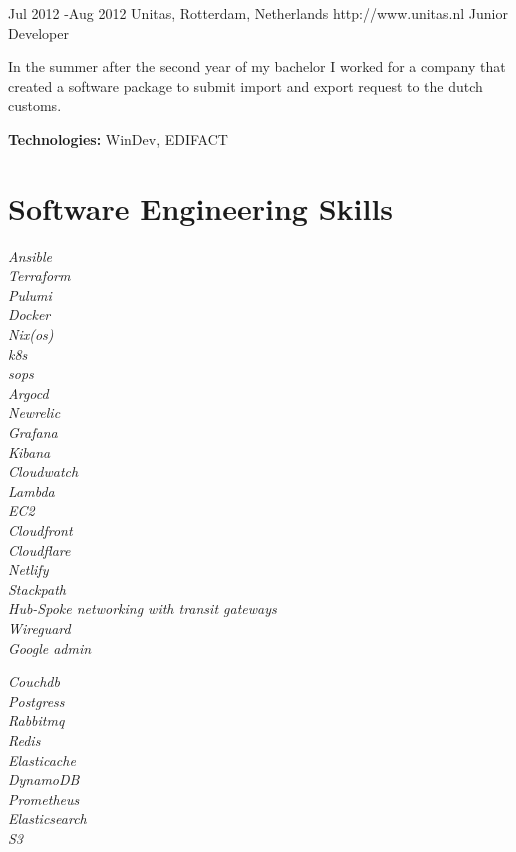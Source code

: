 \documentclass[10pt]{article} %
\begin{document}
\job
{Jul 2012 -}{Aug 2012}
{Unitas, Rotterdam, Netherlands}
{http://www.unitas.nl}
{Junior Developer}
{In the summer after the second year of my bachelor I worked for a company that created a software package to submit import and export request to the dutch customs.

\rule{0mm}{5mm}\textbf{Technologies:} WinDev, EDIFACT
}


\section{Software Engineering Skills}


{
\textit{Ansible}\\
\textit{Terraform}\\
\textit{Pulumi}\\
\textit{Docker}\\
\textit{Nix(os)}\\
\textit{k8s}\\
\textit{sops}\\
\textit{Argocd}\\
\textit{Newrelic}\\
\textit{Grafana}\\
\textit{Kibana}\\
\textit{Cloudwatch}\\
\textit{Lambda}\\
\textit{EC2}\\
\textit{Cloudfront}\\
\textit{Cloudflare}\\
\textit{Netlify}\\
\textit{Stackpath}\\
\textit{Hub-Spoke networking with transit gateways}\\
\textit{Wireguard}\\
\textit{Google admin}\\
}

 {
\textit{Couchdb}\\
\textit{Postgress}\\
\textit{Rabbitmq}\\
\textit{Redis}\\
\textit{Elasticache}\\
\textit{DynamoDB}\\
\textit{Prometheus}\\
\textit{Elasticsearch}\\
\textit{S3}\\
}
\end{document}
